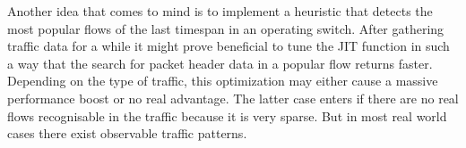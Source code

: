 \documentclass[a4paper,
		12pt,
		parskip=full,
		titlepage
		]{scrartcl}
\begin{document}
Another idea that comes to mind is to implement a heuristic that detects 
the most popular flows of the last timespan in an operating switch.
After gathering traffic data for a while it might prove beneficial to tune 
the JIT function in such a way that the search for packet header data in a popular flow returns faster.
Depending on the type of traffic, this optimization may either cause a massive performance boost or no real advantage.
The latter case enters if there are no real flows recognisable in the traffic because it is very sparse.
But in most real world cases there exist observable traffic patterns.

\newpage
{}


\end{document}
